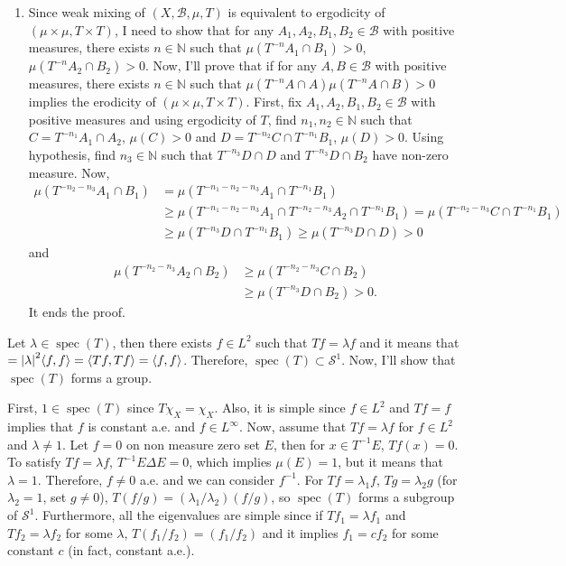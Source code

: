 \documentclass[12pt]{article}
\newenvironment{problem}[2][Problem]{\begin{trivlist}
\item[\hskip \labelsep {\bfseries #1}\hskip \labelsep {\bfseries #2.}]}{\end{trivlist}}
\DeclareMathOperator{\spec}{\mathrm{spec}}
\begin{document}
\begin{enumerate}
    \item[($\Leftarrow$)] Since weak mixing of $(X, \mathcal{B}, \mu, T)$ is equivalent to ergodicity of $(\mu\times \mu, T\times T)$, I need to show that for any $A_1, A_2, B_1, B_2\in \mathcal{B}$ with positive measures, there exists $n\in \mathbb{N}$ such that $\mu(T^{-n}A_1 \cap B_1)>0$, $\mu(T^{-n}A_2 \cap B_2)>0$. Now, I'll prove that if for any $A,B\in \mathcal{B}$ with positive measures, there exists $n\in \mathbb{N}$ such that $\mu(T^{-n}A\cap A)\mu(T^{-n}A\cap B)>0$ implies the erodicity of $(\mu\times \mu, T\times T)$.
    First, fix $A_1, A_2, B_1, B_2\in \mathcal{B}$ with positive measures and using ergodicity of $T$, find $n_1, n_2\in \mathbb{N}$ such that $C=T^{-n_1}A_1\cap A_2$, $\mu(C)>0$ and $D=T^{-n_2}C\cap T^{-n_1}B_1$, $\mu(D)>0$. Using hypothesis, find $n_3\in \mathbb{N}$ such that $T^{-n_3}D\cap D$ and $T^{-n_3}D\cap B_2$ have non-zero measure. Now,
    \begin{equation*}
    \begin{split}
        \mu(T^{-n_2-n_3}A_1\cap B_1)&= \mu(T^{-n_1-n_2-n_3}A_1\cap T^{-n_1}B_1)\\
        &\geq\mu(T^{-n_1-n_2-n_3}A_1\cap T^{-n_2-n_3}A_2\cap T^{-n_1}B_1)=\mu(T^{-n_2-n_3}C\cap T^{-n_1}B_1)\\
        &\geq\mu(T^{-n_3}D\cap T^{-n_1}B_1)\geq \mu(T^{-n_3}D\cap D)>0
        \end{split}
    \end{equation*}
    and
    \begin{equation*}
    \begin{split}
        \mu(T^{-n_2-n_3}A_2\cap B_2)&\geq \mu(T^{-n_2-n_3}C\cap B_2)\\
        &\geq\mu(T^{-n_3}D\cap B_2)>0.
        \end{split}
    \end{equation*}
    It ends the proof.
\end{enumerate}

\begin{problem}{9}
\end{problem}
Let $\lambda\in \spec(T)$, then there exists $f\in L^2$ such that $Tf=\lambda f$ and it means that $=\abs{\lambda}^2\langle f, f \rangle = \langle Tf, Tf\rangle = \langle f, f\rangle$. Therefore, $\spec(T)\subset \mathcal{S}^1$. Now, I'll show that $\spec(T)$ forms a group.

First, $1\in \spec(T)$ since $T\chi_X=\chi_X$. Also, it is simple since $f\in L^2$ and $Tf=f$ implies that $f$ is constant a.e. and $f\in L^\infty$. Now, assume that $Tf=\lambda f$ for $f\in L^2$ and $\lambda\neq 1$. Let $f=0$ on non measure zero set $E$, then for $x\in T^{-1}E$, $Tf(x)=0$. To satisfy $Tf=\lambda f$, $T^{-1}E\Delta E=0$, which implies $\mu(E)=1$, but it means that $\lambda=1$. Therefore, $f\neq 0$ a.e. and we can consider $f^{-1}$. For $Tf=\lambda_1 f$, $Tg=\lambda_2 g$ (for $\lambda_2=1$, set $g\neq 0$), $T(f/g)=(\lambda_1/\lambda_2)(f/g)$, so $\spec(T)$ forms a subgroup of $\mathcal{S}^1$. Furthermore, all the eigenvalues are simple since if $Tf_1=\lambda f_1$ and $Tf_2=\lambda f_2$ for some $\lambda$, $T(f_1/f_2)=(f_1/f_2)$ and it implies $f_1=cf_2$ for some constant $c$ (in fact, constant a.e.).
\end{document}
